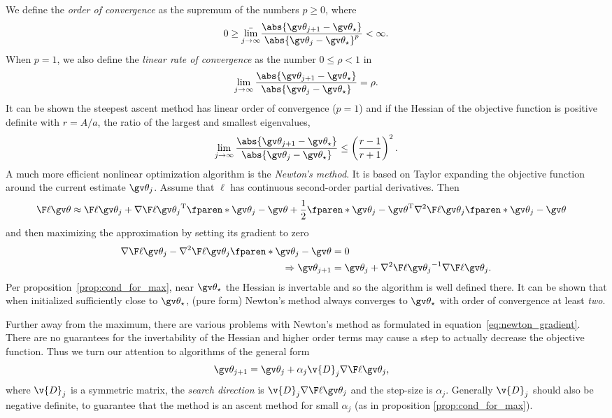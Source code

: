 We define the \emph{order of convergence} as the supremum of the
numbers $p\geq 0$, where
\begin{align}
	0\geq \bar{\lim_{j\to\infty}}\frac{\abs{\Th_{j+1}-\Th_\star}}{\abs{\Th_{j}-\Th_\star}^p} < \infty.
	\label{eq:order_of_convergence}
\end{align}
When $p=1$, we also define the \emph{linear rate of convergence} as
the number $0 \leq \rho < 1$ in
\begin{align}
	\lim_{j\to\infty}\frac{\abs{\Th_{j+1}-\Th_\star}}{\abs{\Th_{j}-\Th_\star}} = \rho.
	\label{eq:rate_of_convergence}
\end{align}
It can be shown the steepest ascent method has linear order of convergence ($p=1$)
and if the Hessian of the objective function is positive definite with
$r=A/a$, the ratio of the largest and smallest eigenvalues, 
\begin{align}
	\lim_{j\to\infty}\frac{\abs{\Th_{j+1}-\Th_\star}}{\abs{\Th_{j}-\Th_\star}} \leq \left(\frac{r-1}{r+1}\right)^2.
\end{align}
A much more efficient nonlinear optimization algorithm is the \emph{Newton's method}.
It is based on Taylor expanding the objective function around the
current estimate $\Th_j$. Assume that $\ell$ has continuous second-order partial derivatives. Then
\begin{align}
	\lLH[\Th] &\approx \lLH[\Th_j]+\nabla\lLH[\Th_j]^\tr\fparen*{\Th_j-\Th}+\frac{1}{2}\fparen*{\Th_j-\Th}^\tr\nabla^2\lLH[\Th_j]\fparen*{\Th_j-\Th}
	\label{eq:second_order_expansion}
\end{align}
and then maximizing the approximation by setting its gradient to zero
\begin{align}
	\nabla\lLH[\Th_j]-\nabla^2\lLH[\Th_j]\fparen*{\Th_j-\Th} &= 0\\
	\Rightarrow \Th_{j+1} &= \Th_j+\nabla^2\lLH[\Th_j]^{-1}\nabla\lLH[\Th_j].
	\label{eq:newton_gradient}
\end{align}
Per proposition~\ref{prop:cond_for_max}, near $\Th_\star$ the Hessian is 
invertable and so the algorithm is well defined there. It can be shown
that when initialized sufficiently close to $\Th_\star$, (pure form)
Newton's method always converges to $\Th_\star$ with order of convergence
at least \emph{two}.
 
Further away from the maximum, there are various problems with Newton's method as formulated
in equation~\eqref{eq:newton_gradient}. There are no guarantees for the invertability
of the Hessian and higher order terms may cause a step to actually decrease the objective
function. Thus we turn our attention to algorithms of the general form
\begin{align}
	\Th_{j+1} &= \Th_j+\alpha_j\v{D}_j\nabla\lLH[\Th_j],
	\label{eq:gradient_method_general}
\end{align}
where $\v{D}_j$ is a symmetric matrix, the \emph{search direction} is $\v{D}_j\nabla\lLH[\Th_j]$ and
the step-size is $\alpha_j$. Generally $\v{D}_j$ should also be negative definite, to guarantee
that the method is an ascent method for small $\alpha_j$ (as in proposition \eqref{prop:cond_for_max}).
  
